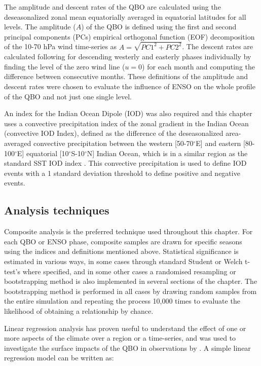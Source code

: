 The amplitude and descent rates of the QBO are calculated using the deseasonalized zonal mean equatorially averaged in equatorial latitudes for all levels. 
The amplitude ($A$) of the QBO is defined using the first and second principal components (PCs)  empirical orthogonal function (EOF) decomposition of the 10-70 hPa wind time-series \citep{serva2020} as $A=\sqrt{PC1^2+PC2^2}$.
The descent rates are calculated following \cite{schenzinger2017} for descending westerly and easterly phases individually by finding the level of the zero wind line ($u=0$) for each month and computing the difference between consecutive months.
These definitions of the amplitude and descent rates were chosen to evaluate the influence of ENSO on the whole profile of the QBO and not just one single level. 

An index for the Indian Ocean Dipole (IOD) was also required and this chapter uses a convective precipitation index of the zonal gradient in the Indian Ocean (convective IOD Index), defined as the difference of the deseasonalized area-averaged convective precipitation between the western [50-70$^\circ$E] and eastern [80-100$^\circ$E] equatorial [10$^\circ$S-10$^\circ$N] Indian Ocean, which is in a similar region as the standard SST IOD index \citep{wang2014iod}. 
This convective precipitation is used to define IOD events with a 1 standard deviation threshold to define positive and negative events. 

\subsection{Analysis techniques}
\label{sq:analysis}

Composite analysis is the preferred technique used throughout this chapter. For each QBO or ENSO phase, composite samples are drawn for specific seasons using the indices and definitions mentioned above. 
Statistical significance is estimated in various ways, in some cases through standard Student or Welch t-test's where specified, and in some other cases a randomised resampling or bootstrapping method is also implemented in several sections of the chapter. 
The bootstrapping method is performed in all cases by drawing random samples from the entire simulation and repeating the process 10,000 times to evaluate the likelihood of obtaining a relationship by chance. 

Linear regression analysis has proven useful to understand the effect of one or more aspects of the climate over a region or a time-series, and was used to investigate the surface impacts of the QBO in observations by \cite{gray2018}. 
A simple linear regression model can be written as:

